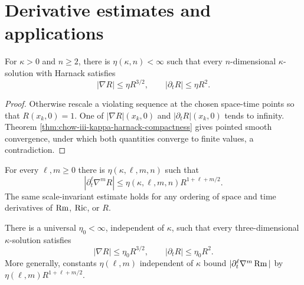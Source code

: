 \section{Derivative estimates and applications}

\begin{theorem}
\label{thm:chow-iii-kappa-scaled-derivative-estimates}


For $\kappa>0$ and $n\ge2$, there is $\eta(\kappa,n)<\infty$ such that every
$n$-dimensional $\kappa$-solution with Harnack satisfies
\[
 |\nabla R|\le\eta R^{3/2},
 \qquad |\partial_tR|\le\eta R^2.
\]
\end{theorem}
\begin{proof}
\sketch Otherwise rescale a violating sequence at the chosen space-time points so
that $R(x_k,0)=1$.  One of $|\nabla R|(x_k,0)$ and
$|\partial_tR|(x_k,0)$ tends to infinity.  Theorem
\ref{thm:chow-iii-kappa-harnack-compactness} gives pointed smooth convergence,
under which both quantities converge to finite values, a contradiction.
\end{proof}

\begin{remark}
\label{rem:chow-iii-kappa-all-derivative-estimates}


For every $\ell,m\ge0$ there is $\eta(\kappa,\ell,m,n)$ such that
\[
 |\partial_t^\ell\nabla^mR|
 \le\eta(\kappa,\ell,m,n)R^{1+\ell+m/2}.
\]
The same scale-invariant estimate holds for any ordering of space and time
derivatives of $\operatorname{Rm}$, $\operatorname{Ric}$, or $R$.
\end{remark}

\begin{corollary}
\label{cor:chow-iii-3d-universal-scaled-derivatives}


There is a universal $\eta_0<\infty$, independent of $\kappa$, such that
every three-dimensional $\kappa$-solution satisfies
\[
 |\nabla R|\le\eta_0R^{3/2},
 \qquad |\partial_tR|\le\eta_0R^2.
\]
More generally, constants $\eta(\ell,m)$ independent of $\kappa$ bound
$|\partial_t^\ell\nabla^m\operatorname{Rm}|$ by
$\eta(\ell,m)R^{1+\ell+m/2}$.
\end{corollary}

